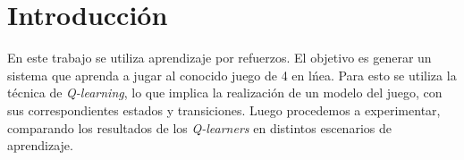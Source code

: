 \section{Introducción}

En este trabajo se utiliza aprendizaje por refuerzos. El objetivo es generar un sistema que aprenda a jugar al conocido juego de 4 en l\'nea. Para esto se utiliza la técnica de \emph{Q-learning}, lo que implica la realizaci\'on de un modelo del juego, con sus correspondientes estados y transiciones. Luego procedemos a experimentar, comparando los resultados de los \emph{Q-learners} en distintos escenarios de aprendizaje.
